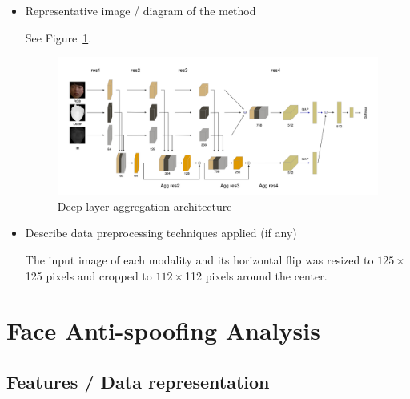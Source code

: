 \documentclass{article}
\begin{document}
\begin{itemize}
[2] Dong Yi, Zhen Lei, Shengcai Liao, Stan Z. Li, "Learning Face Representation from Scratch", arXiv, 2014. \\

[3] Zhenxing Niu, Mo Zhou, Le Wang, Xinbo Gao, Gang Hua, "Ordinal Regression With Multiple Output CNN for Age Estimation", The IEEE Conference on Computer Vision and Pattern Recognition (CVPR), 2016, pp. 4920-4928 \\

[4] Yandong Guo, Lei Zhang, Yuxiao Hu, Xiaodong He, Jianfeng Gao, "MS-Celeb-1M: Challenge of Recognizing One Million Celebrities in the Real World", 2016


\item Representative image / diagram of the method

See Figure~\ref{fig:architecture}.
\begin{figure}
\centering
\includegraphics[width=12cm]{figures/net.jpg}
\caption{Deep layer aggregation architecture}
\label{fig:architecture}
\end{figure}


\item Describe data preprocessing techniques applied (if any)

The input image of each modality and its horizontal flip was resized to $125 \times $125 pixels and cropped to $112 \times $112 pixels around the center.

\end{itemize}

\section{Face Anti-spoofing Analysis}

\subsection{Features / Data representation}
\end{document}
